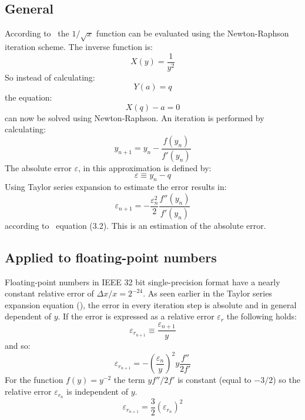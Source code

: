 \subsection{General}
According to~\cite{Bekker87} the $1/\sqrt{x}$ function can be evaluated using
the Newton-Raphson iteration scheme. The inverse function is:
\begin{equation}
X(y) = \frac{1}{y^{2}}
\end{equation}
So instead of calculating:
\begin{equation}
Y(a) = q
\end{equation}
the equation:
\begin{equation}
X(q) - a = 0
\label{eqn:inversef}
\end{equation}
can now be solved using Newton-Raphson. An iteration is performed by
calculating:
\begin{equation}
y_{n+1} = y_{n} - \frac{f(y_{n})}{f'(y_{n})}
\label{eqn:nr}
\end{equation}
The absolute error $\varepsilon$, in this approximation is defined by:
\begin{equation}
\varepsilon \equiv y_{n} - q
\end{equation}
Using Taylor series expansion to estimate the error results in:
\begin{equation}
\varepsilon _{n+1} = - \frac{\varepsilon _{n}^{2}}{2}
                       \frac{ f''(y_{n})}{f'(y_{n})}
\label{eqn:taylor}
\end{equation}
according to~\cite{Bekker87} equation (3.2). This is an estimation of the
absolute error.

\subsection{Applied to floating-point numbers}
Floating-point numbers in IEEE 32 bit single-precision format have a nearly
constant relative error of $\Delta x / x = 2^{-24}$. As seen earlier in the
Taylor series expansion equation (), the error in every
iteration step is absolute and in general dependent of $y$. If the error is
expressed as a relative error $\varepsilon_{r}$ the following holds:
\begin{equation}
\varepsilon _{{r}_{n+1}} \equiv \frac{\varepsilon_{n+1}}{y}
\end{equation}
and so:
\begin{equation}
\varepsilon _{{r}_{n+1}} =
- ( \frac{\varepsilon _{n}}{y} )^{2} y \frac{ f''}{2f'}
\end{equation}
For the function $f(y) = y^{-2}$ the term $y f''/2f'$ is constant (equal
to $-3/2$) so the relative error $\varepsilon _{r_{n}}$ is independent of $y$.
\begin{equation}
\varepsilon _{{r}_{n+1}} =
\frac{3}{2} (\varepsilon_{r_{n}})^{2}
\label{eqn:epsr}
\end{equation}


